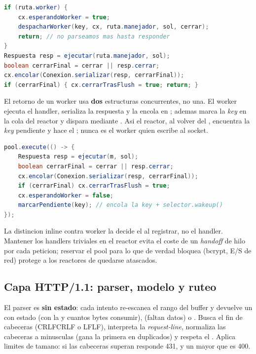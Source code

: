 \begin{lstlisting}[language=Java,caption={Bifurcacion inline vs worker en procesar()}]
if (ruta.worker) {
    cx.esperandoWorker = true;
    despacharWorker(key, cx, ruta.manejador, sol, cerrar);
    return; // no parseamos mas hasta responder
}
Respuesta resp = ejecutar(ruta.manejador, sol);
boolean cerrarFinal = cerrar || resp.cerrar;
cx.encolar(Conexion.serializar(resp, cerrarFinal));
if (cerrarFinal) { cx.cerrarTrasFlush = true; return; }
\end{lstlisting}

El retorno de un worker usa \textbf{dos} estructuras concurrentes, no una. El
worker ejecuta el handler, serializa la respuesta y la encola en
; ademas marca la \emph{key} en la cola
 del reactor y dispara 
mediante . Asi el reactor, al volver del
, encuentra la \emph{key} pendiente y hace el ;
nunca es el worker quien escribe al socket.

\begin{lstlisting}[language=Java,caption={despacharWorker: el worker solo encola y despierta}]
pool.execute(() -> {
    Respuesta resp = ejecutar(m, sol);
    boolean cerrarFinal = cerrar || resp.cerrar;
    cx.encolar(Conexion.serializar(resp, cerrarFinal));
    if (cerrarFinal) cx.cerrarTrasFlush = true;
    cx.esperandoWorker = false;
    marcarPendiente(key); // encola la key + selector.wakeup()
});
\end{lstlisting}

\begin{consejo}
La distincion inline contra worker la decide el  al registrar,
no el handler. Mantener los handlers triviales en el reactor evita el coste de un
\emph{handoff} de hilo por cada peticion; reservar el pool para lo que de verdad
bloquea (bcrypt, E/S de red) protege a los reactores de quedarse atascados.
\end{consejo}

\subsection{Capa HTTP/1.1: parser, modelo y ruteo}

El parser  es \textbf{sin estado}: cada
intento re-escanea el rango \codigo{[0,len)} del buffer y devuelve un
 con estado  (con la  y cuantos
bytes consumir),  (faltan datos) o . Busca el fin
de cabeceras (CRLFCRLF o LFLF), interpreta la \emph{request-line}, normaliza las
cabeceras a minusculas (gana la primera en duplicados) y respeta el
. Aplica limites de tamano: si las cabeceras superan
 responde 431, y un  mayor que
 es 400.


